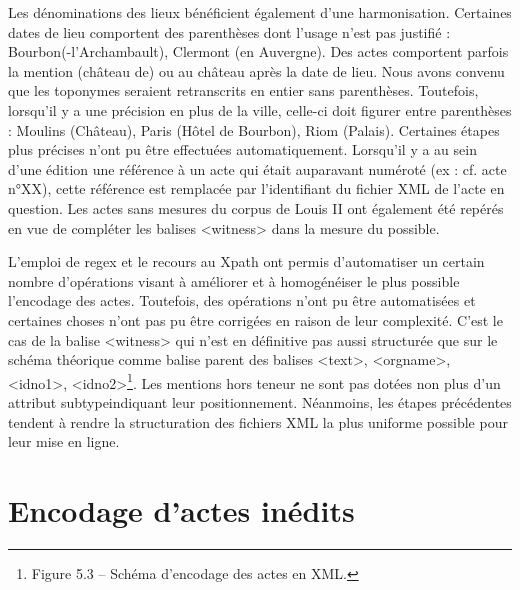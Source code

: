 \par Les dénominations des lieux bénéficient également d'une harmonisation. Certaines dates de lieu comportent des parenthèses dont l'usage n'est pas justifié : Bourbon(-l’Archambault), Clermont (en Auvergne). Des actes comportent parfois la mention \og (château de) \fg \space ou \og au château \fg \space après la date de lieu. Nous avons convenu que les toponymes seraient retranscrits en entier sans parenthèses. Toutefois, lorsqu'il y a une précision en plus de la ville, celle-ci doit figurer entre parenthèses : Moulins (Château), Paris (Hôtel de Bourbon), Riom (Palais). Certaines étapes plus précises n'ont pu être effectuées automatiquement. Lorsqu'il y a au sein d'une édition une référence à un acte qui était auparavant numéroté (ex : cf. acte n°XX), cette référence est remplacée par l'identifiant du fichier XML de l'acte en question. Les actes sans mesures du corpus de Louis II ont également été repérés en vue de compléter les balises <witness> dans la mesure du possible. 
\newline 

\par L'emploi de regex et le recours au Xpath ont permis d'automatiser un certain nombre d'opérations visant à améliorer et à homogénéiser le plus possible l'encodage des actes. Toutefois, des opérations n'ont pu être automatisées et certaines choses n'ont pas pu être corrigées en raison de leur complexité. C'est le cas de la balise <witness> qui n'est en définitive pas aussi structurée que sur le schéma théorique comme balise parent des balises <text>, <orgname>, <idno1>, <idno2>\footnote{Figure 5.3 – Schéma d’encodage des actes en XML.}. Les mentions hors teneur ne sont pas dotées non plus d'un attribut \og subtype\fg \space indiquant leur positionnement. Néanmoins, les étapes précédentes tendent à rendre la structuration des fichiers XML la plus uniforme possible pour leur mise en ligne. 
\newpage 

\section{Encodage d'actes inédits}

